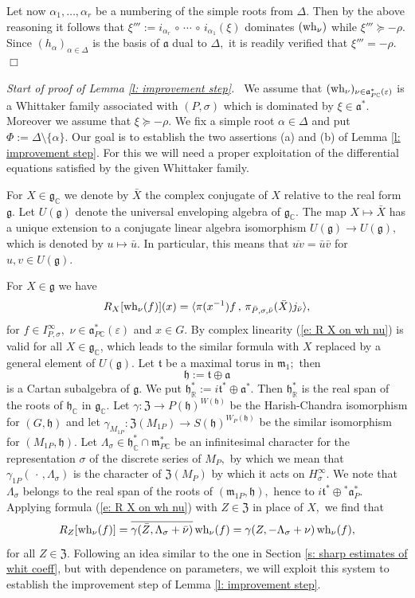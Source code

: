 \documentclass[12pt,a4paper]{article}
\def\qed{~\hfill\hbox{$\Box$}\medbreak}
\def\msy#1{{\mathbb #1}}
\def\C{{\msy C}}
\def\R{{\msy R}}
\def\ga{\alpha}
\def\ge{\varepsilon}
\def\gg{\gamma}
\def\gs{\sigma}
\def\gD{\Delta}
\def\got#1{\mathfrak #1}
\def\fa{{\got a}}
\def\fg{{\got g}}
\def\fh{{\got h}}
\def\fm{{\got m}}
\def\ft{{\got t}}
\def\to{\rightarrow}
\def\inp#1#2{\langle#1\,,\,#2\rangle}
\def\after{\,{\scriptstyle\circ}\,}
\def\iC{{\scriptscriptstyle \C}}
\def\iR{{\scriptscriptstyle \R}}
\numberwithin{Thm}{section}
\numberwithin{equation}{section}
\def\dotvar{\, \cdot\,}
\def\fZ{{\mathfrak Z}}
\def\faPdc{{\fa_{P\iC}^*}}
\def\gL{\Lambda}
\numberwithin{equation}{section}
\def\fad{{\fa^*}}
\def\fZ{{\mathfrak Z}}
\def\gL{\Lambda}
\def\ft{\mathfrak t}
\def\faPdc{\fa_{P\iC}^*}
\def\fh{{\mathfrak h}}
\def\IPgs{I_{P,\gs}^\infty}
\def\wh{{\rm wh}}
\def\xxi{\xi}
\begin{document}
Let now $\ga_1, \ldots, \ga_r$ be a numbering of the simple roots from $\gD.$ 
Then by the above reasoning it follows that 
$\xxi''':= i_{\ga_r} \after \cdots \after i_{\ga_1} (\xxi)$ dominates $(\wh_\nu)$ while 
$\xxi''' \succeq -\rho.$ Since $(h_\ga)_{\ga \in \gD}$ is the basis of $\fa$ dual to $\gD,$ 
it is readily verified that  $\xxi''' = -\rho.$ 
\qed

{\em Start of proof of Lemma \ref{l: improvement step}.\ }
We assume that  $(\wh_\nu)_{\nu \in \faPdc(\ge)}$ is a Whittaker family associated
with $(P,\gs)$ which is  dominated by $\xxi \in \fad. $ Moreover we assume that $\xxi \succeq -\rho.$ We fix a simple root $\ga \in \gD$ and put $\Phi:= \gD\setminus \{\ga\}.$ 
Our goal is to establish the two assertions (a) and (b) of Lemma \ref{l: improvement step}.
For this we will need a proper exploitation 
of the differential equations satisfied by the given Whittaker family. 

For $X \in \fg_\iC$ 
we denote by $\bar X$ the complex conjugate of $X$ relative to the real form $\fg.$ 
Let $U(\fg)$ denote the universal enveloping algebra of $\fg_{\iC}.$ 
The map $X \mapsto \bar X$ has a unique extension to a conjugate linear algebra 
isomorphism  $U(\fg) \to U(\fg),$ which is denoted by $u\mapsto \bar u.$ 
In particular, this means that $\overline{uv} = \bar u\bar v$ for $u,v \in U(\fg).$ 

For $X \in \fg$ we have 
\begin{equation}
\label{e: R X on wh nu} 
R_X [\wh_\nu (f)](x) = \inp{\pi(x^{-1})f}{\pi_{\bar P, \gs, \bar\nu}( \bar X) j_{\bar \nu}},
\end{equation}
for $f \in \IPgs,$ $\nu \in \faPdc(\ge)$ and $x \in G.$ 
By complex linearity (\ref{e: R X on wh nu}) is valid for all $X \in \fg_\iC$, which leads to the similar 
formula with $X$ replaced by a general element of  $U(\fg).$ 
Let $\ft$ be a maximal 
torus in $\fm_1;$ then 
$$ 
\fh := \ft \oplus \fa
$$ 
is a Cartan subalgebra of $\fg.$ 
We put $\fh^*_\iR:= i \ft^* \oplus \fa^*.$ Then $\fh^*_\iR$ is the real 
span of the roots of $\fh_\iC$ in $\fg_\iC.$  Let $\gg: \fZ \to P(\fh)^{W(\fh)}$ 
be the Harish-Chandra isomorphism for  $(G,\fh)$ and let 
$\gg_{M_{1P}}: \fZ(M_{1P}) \to S(\fh)^{W_P(\fh)}$ be the similar isomorphism
for $(M_{1P}, \fh).$ 
Let $\gL_\gs \in \fh_\iC^*  \cap \fm_{P\iC}^*$ be an infinitesimal character for 
the representation $\gs$ of the discrete series of $M_P,$ by which we mean that
$\gg_{1P}(\dotvar, \gL_\gs)$ is the character of $\fZ(M_P)$ by which it acts
on $H_\gs^\infty.$ We note that $\gL_\gs $ belongs to the real span of the
roots of $(\fm_{1P}, \fh),$ hence to $i\ft^* \oplus {}^*\fa_P^*.$ 
Applying formula (\ref{e: R X on wh nu}) with $Z \in \fZ$ in place of $X,$ we find
that 
\begin{equation}
\label{e: whittaker system of differential operators}
R_Z [\wh_\nu(f)] = \overline{\gg(\bar Z, \gL_\gs + \bar \nu)}\, \wh_\nu(f) =  \gg(Z, -\gL_\gs + \nu)\, \wh_\nu(f),
\end{equation} 
for all $Z \in \fZ.$ 
Following an idea similar to the one in Section \ref{s: sharp estimates of whit coeff}, but with dependence on parameters, we will exploit this system to establish the improvement 
step of Lemma \ref{l: improvement step}. 
\end{document}
